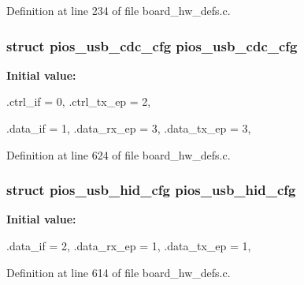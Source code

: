 \-Definition at line 234 of file board\-\_\-hw\-\_\-defs.\-c.

\hypertarget{group___pip_xtreme_ga05cc3e449d417c7f9097d2659e6f5ca3}{
\subsubsection[{pios\-\_\-usb\-\_\-cdc\-\_\-cfg}]{\setlength{\rightskip}{0pt plus 5cm}struct {\bf pios\-\_\-usb\-\_\-cdc\-\_\-cfg} {\bf pios\-\_\-usb\-\_\-cdc\-\_\-cfg}}}\label{group___pip_xtreme_ga05cc3e449d417c7f9097d2659e6f5ca3}
{\bfseries \-Initial value\-:}
\begin{DoxyCode}
 {
        .ctrl_if = 0,
        .ctrl_tx_ep = 2,

        .data_if = 1,
        .data_rx_ep = 3,
        .data_tx_ep = 3,
}
\end{DoxyCode}


\-Definition at line 624 of file board\-\_\-hw\-\_\-defs.\-c.

\hypertarget{group___pip_xtreme_ga3665f6d3a2cccc431b55b9432291e94c}{
\subsubsection[{pios\-\_\-usb\-\_\-hid\-\_\-cfg}]{\setlength{\rightskip}{0pt plus 5cm}struct {\bf pios\-\_\-usb\-\_\-hid\-\_\-cfg} {\bf pios\-\_\-usb\-\_\-hid\-\_\-cfg}}}\label{group___pip_xtreme_ga3665f6d3a2cccc431b55b9432291e94c}
{\bfseries \-Initial value\-:}
\begin{DoxyCode}
 {
        .data_if = 2,
        .data_rx_ep = 1,
        .data_tx_ep = 1,
}
\end{DoxyCode}


\-Definition at line 614 of file board\-\_\-hw\-\_\-defs.\-c.

